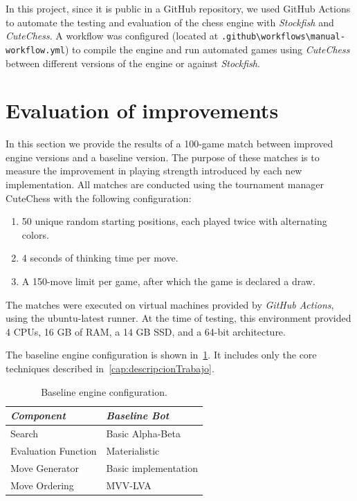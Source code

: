 \vspace{1em}

\parbox{\textwidth}{\noindent In this project, since it is public in a GitHub repository, we used GitHub Actions to automate the testing and evaluation of the chess engine with \textit{Stockfish} and \textit{CuteChess}. A workflow was configured (located at \texttt{.github\textbackslash{}workflows\textbackslash{}manual-workflow.yml}) to compile the engine and run automated games using \textit{CuteChess} between different versions of the engine or against \textit{Stockfish}.}

\section{Evaluation of improvements}

\noindent In this section we provide the results of a 100-game match between improved engine versions and a baseline version. The purpose of these matches is to measure the improvement in playing strength introduced by each new implementation. All matches are conducted using the tournament manager CuteChess with the following configuration:

\begin{enumerate}
    \item 50 unique random starting positions, each played twice with alternating colors.
    \item 4 seconds of thinking time per move.
    \item A 150-move limit per game, after which the game is declared a draw.
\end{enumerate}

\vspace{1em}

\parbox{\textwidth}{The matches were executed on virtual machines provided by \textit{GitHub Actions}, using the ubuntu-latest runner. At the time of testing, this environment provided 4 CPUs, 16 GB of RAM, a 14 GB SSD, and a 64-bit architecture.}

\vspace{1em}

\noindent The baseline engine configuration is shown in~\cref{tab:baselineBot}. It includes only the core techniques described in~\cref{cap:descripcionTrabajo}.

\begin{table}[H]
    \centering
    \begin{tabular}{|p{4cm}|p{4cm}|}
    \hline
    \textit{Component}         & \textit{Baseline Bot}     \\ \hline
    Search                     & Basic Alpha-Beta           \\ \hline
    Evaluation Function        & Materialistic        \\ \hline
    Move Generator             & Basic implementation   \\ \hline
    Move Ordering              & MVV-LVA                \\ \hline
    \end{tabular}
    \caption{Baseline engine configuration.}
    \label{tab:baselineBot}
\end{table}

